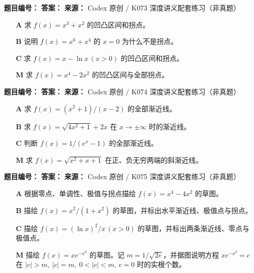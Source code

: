 \begin{problemBox}
\begin{problemMeta}
\textbf{题目编号：}  \quad
\textbf{答案：}  \quad
\textbf{来源：} Codex 原创 / K073 深度讲义配套练习（非真题）
\end{problemMeta}
\begin{enumerate}
  \item[\textbf{A}] 求 \(f(x)=x^3+x^2\) 的凹凸区间和拐点。
  \item[\textbf{B}] 说明 \(f(x)=x^6+x^4\) 的 \(x=0\) 为什么不是拐点。
  \item[\textbf{C}] 求 \(f(x)=x-\ln x\,(x>0)\) 的凹凸区间和拐点。
  \item[\textbf{M}] 求 \(f(x)=x^4-2x^2\) 的凹凸区间与全部拐点。
\end{enumerate}
\end{problemBox}

\begin{problemBox}
\begin{problemMeta}
\textbf{题目编号：}  \quad
\textbf{答案：}  \quad
\textbf{来源：} Codex 原创 / K074 深度讲义配套练习（非真题）
\end{problemMeta}
\begin{enumerate}
  \item[\textbf{A}] 求 \(f(x)=(x^2+1)/(x-2)\) 的全部渐近线。
  \item[\textbf{B}] 求 \(f(x)=\sqrt{4x^2+1}+2x\) 在 \(x\to\pm\infty\) 时的渐近线。
  \item[\textbf{C}] 判断 \(f(x)=1/(e^x-1)\) 的全部渐近线。
  \item[\textbf{M}] 求 \(f(x)=\sqrt{x^2+x+1}\) 在正、负无穷两端的斜渐近线。
\end{enumerate}
\end{problemBox}

\begin{problemBox}
\begin{problemMeta}
\textbf{题目编号：}  \quad
\textbf{答案：}  \quad
\textbf{来源：} Codex 原创 / K075 深度讲义配套练习（非真题）
\end{problemMeta}
\begin{enumerate}
  \item[\textbf{A}] 根据零点、单调性、极值与拐点描绘 \(f(x)=x^4-4x^2\) 的草图。
  \item[\textbf{B}] 描绘 \(f(x)=x^2/(1+x^2)\) 的草图，并标出水平渐近线、极值点与拐点。
  \item[\textbf{C}] 描绘 \(f(x)=(\ln x)^2/x\,(x>0)\) 的草图，并标出两条渐近线、零点与极值点。
  \item[\textbf{M}] 描绘 \(f(x)=xe^{-x^2}\) 的草图。记 \(m=1/\sqrt{2e}\)，并据图说明方程 \(xe^{-x^2}=c\) 在 \(|c|>m,\ |c|=m,\ 0<|c|<m,\ c=0\) 时的实根个数。
\end{enumerate}
\end{problemBox}

